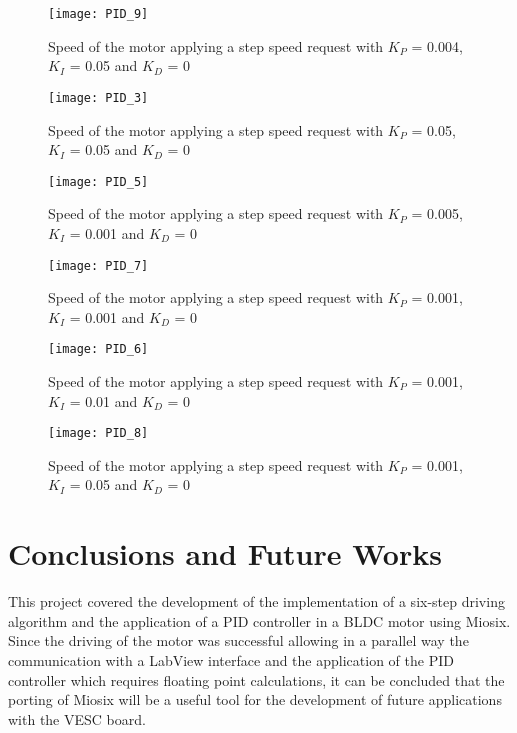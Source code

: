 \begin{figure} [H]
\centering\texttt{[image: PID\_9]}
\caption{Speed of the motor applying a step speed request with $K_P$ = 0.004, $K_I$ = 0.05 and $K_D$ = 0}
\label{fig:PID_9}
\end{figure}

\begin{figure} [H]
\centering\texttt{[image: PID\_3]}
\caption{Speed of the motor applying a step speed request with $K_P$ = 0.05, $K_I$ = 0.05 and $K_D$ = 0}
\label{fig:PID_3}
\end{figure}


\begin{figure} [H]
\centering\texttt{[image: PID\_5]}
\caption{Speed of the motor applying a step speed request with $K_P$ = 0.005, $K_I$ = 0.001 and $K_D$ = 0}
\label{fig:PID_5}
\end{figure}

\begin{figure} [H]
\centering\texttt{[image: PID\_7]}
\caption{Speed of the motor applying a step speed request with $K_P$ = 0.001, $K_I$ = 0.001 and $K_D$ = 0}
\label{fig:PID_7}
\end{figure}

\begin{figure} [H]
\centering\texttt{[image: PID\_6]}
\caption{Speed of the motor applying a step speed request with $K_P$ = 0.001, $K_I$ = 0.01 and $K_D$ = 0}
\label{fig:PID_6}
\end{figure}

\begin{figure} [H]
\centering\texttt{[image: PID\_8]}
\caption{Speed of the motor applying a step speed request with $K_P$ = 0.001, $K_I$ = 0.05 and $K_D$ = 0}
\label{fig:PID_8}
\end{figure}


\pagebreak

\section{Conclusions and Future Works}
This project covered the development of the implementation of a six-step driving algorithm and the application of a PID controller in a BLDC motor using Miosix. Since the driving of the motor was successful allowing in a parallel way the communication with a LabView interface and the application of the PID controller which requires floating point calculations, it can be concluded that the porting of Miosix will be a useful tool for the development of future applications with the VESC board.\\

